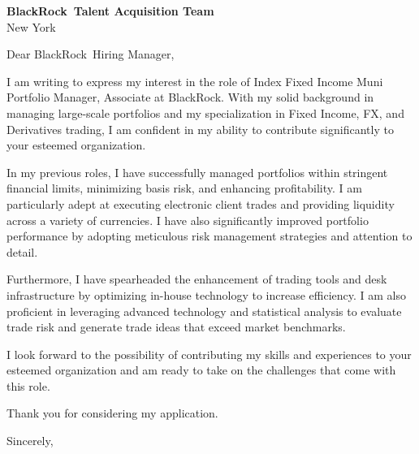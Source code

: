 \documentclass{letter}
\newcommand{\company}{BlackRock}
\begin{document}
\begin{letter}{\textbf{\company\ Talent Acquisition Team} \\                
                New York }

\opening{Dear \company\ Hiring Manager,}

I am writing to express my interest in the role of Index Fixed Income Muni Portfolio Manager, Associate at BlackRock. With my solid background in managing large-scale portfolios and my specialization in Fixed Income, FX, and Derivatives trading, I am confident in my ability to contribute significantly to your esteemed organization.

In my previous roles, I have successfully managed portfolios within stringent financial limits, minimizing basis risk, and enhancing profitability. I am particularly adept at executing electronic client trades and providing liquidity across a variety of currencies. I have also significantly improved portfolio performance by adopting meticulous risk management strategies and attention to detail.

Furthermore, I have spearheaded the enhancement of trading tools and desk infrastructure by optimizing in-house technology to increase efficiency. I am also proficient in leveraging advanced technology and statistical analysis to evaluate trade risk and generate trade ideas that exceed market benchmarks.

I look forward to the possibility of contributing my skills and experiences to your esteemed organization and am ready to take on the challenges that come with this role.

Thank you for considering my application.



\closing{Sincerely,}

\end{letter}
\end{document}
